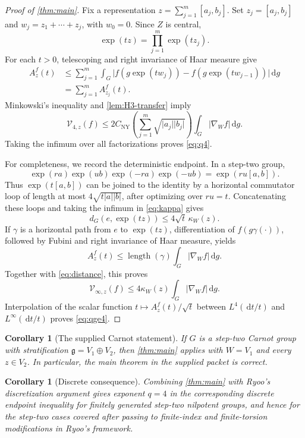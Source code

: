 \documentclass[11pt]{article}
\newtheorem{corollary}[theorem]{Corollary}
\theoremstyle{remark}
\newcommand{\g}{\mathfrak g}
\newcommand{\dd}{\,\mathrm d}
\newcommand{\abs}[1]{\lvert #1\rvert}
\begin{document}
\begin{proof}[Proof of \cref{thm:main}]
Fix a representation \(z=\sum_{j=1}^m[a_j,b_j]\).  Set
\(z_j=[a_j,b_j]\) and \(w_j=z_1+\cdots+z_j\), with \(w_0=0\).  Since \(Z\) is
central,
\[
 \exp(tz)=\prod_{j=1}^m\exp(tz_j).
\]
For each \(t>0\), telescoping and right invariance of Haar measure give
\begin{align*}
 A_z^f(t)
 &\le\sum_{j=1}^m
 \int_G\abs{f(g\exp(tw_j))-f(g\exp(tw_{j-1}))}\dd g\\
 &=\sum_{j=1}^m A_{z_j}^f(t).
\end{align*}
Minkowski's inequality and \cref{lem:H3-transfer} imply
\[
 \mathcal V_{4,z}(f)
 \le 2C_{\mathrm{NY}}
 \left(\sum_{j=1}^m\sqrt{\abs{a_j}\abs{b_j}}\right)
 \int_G\abs{\nabla_Wf}\dd g.
\]
Taking the infimum over all factorizations proves \eqref{eq:q4}.

For completeness, we record the deterministic endpoint.  In a step-two group,
\[
 \exp(ra)\exp(ub)\exp(-ra)\exp(-ub)=\exp(ru[a,b]).
\]
Thus \(\exp(t[a,b])\) can be joined to the identity by a horizontal commutator loop
of length at most \(4\sqrt{t\abs a\abs b}\), after optimizing over \(ru=t\).
Concatenating these loops and taking the infimum in \eqref{eq:kappa} gives
\begin{equation}\label{eq:distance}
 d_G(e,\exp(tz))\le4\sqrt t\,\kappa_W(z).
\end{equation}
If \(\gamma\) is a horizontal path from \(e\) to \(\exp(tz)\), differentiation of
\(f(g\gamma(\cdot))\), followed by Fubini and right invariance of Haar measure, yields
\[
 A_z^f(t)\le \operatorname{length}(\gamma)
 \int_G\abs{\nabla_Wf}\dd g.
\]
Together with \eqref{eq:distance}, this proves
\begin{equation}\label{eq:qinf}
 \mathcal V_{\infty,z}(f)
 \le4\kappa_W(z)\int_G\abs{\nabla_Wf}\dd g.
\end{equation}
Interpolation of the scalar function \(t\mapsto A_z^f(t)/\sqrt t\) between
\(L^4(\dd t/t)\) and \(L^\infty(\dd t/t)\) proves \eqref{eq:qge4}.
\end{proof}

\begin{corollary}[The supplied Carnot statement]\label{cor:Carnot}
If \(G\) is a step-two Carnot group with stratification \(\g=V_1\oplus V_2\), then
\cref{thm:main} applies with \(W=V_1\) and every \(z\in V_2\).  In particular, the
main theorem in the supplied packet is correct.
\end{corollary}

\begin{corollary}[Discrete consequence]\label{cor:discrete}
Combining \cref{thm:main} with Ryoo's discretization argument gives exponent \(q=4\)
in the corresponding discrete endpoint inequality for finitely generated step-two
nilpotent groups, and hence for the step-two cases covered after passing to finite-index
and finite-torsion modifications in Ryoo's framework.
\end{corollary}
\end{document}
